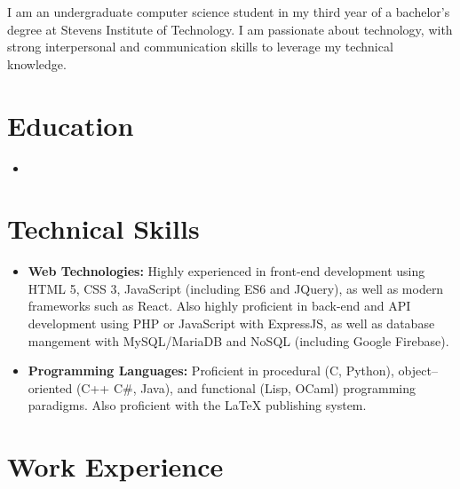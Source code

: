 \documentclass[11pt,a4paper,sans]{moderncv}
\begin{document}
\makecvtitle
\small{I am an undergraduate computer science student in my third year of a bachelor's degree at Stevens Institute of Technology. I am passionate about technology, with strong interpersonal and communication skills to leverage my technical knowledge.}
\section{Education}
\vspace{5pt}
\begin{itemize}
\item{}
\end{itemize}
\vspace{2pt}

\section{Technical Skills}

\vspace{6pt}

\begin{itemize}

\item \textbf{Web Technologies:} Highly experienced in front-end development using HTML 5, CSS 3, JavaScript (including ES6 and JQuery), as well as modern frameworks such as React. Also highly proficient in back-end and API development using PHP or JavaScript with ExpressJS, as well as database mangement with MySQL/MariaDB and NoSQL (including Google Firebase).
  
\vspace{6pt}
    
\item \textbf{Programming Languages:} Proficient in procedural (C, Python), object--oriented (C++ C\#, Java), and functional (Lisp, OCaml) programming paradigms. Also proficient with the LaTeX publishing system.
  
\end{itemize}

\section{Work Experience}

\vspace{6pt}
\end{document}
